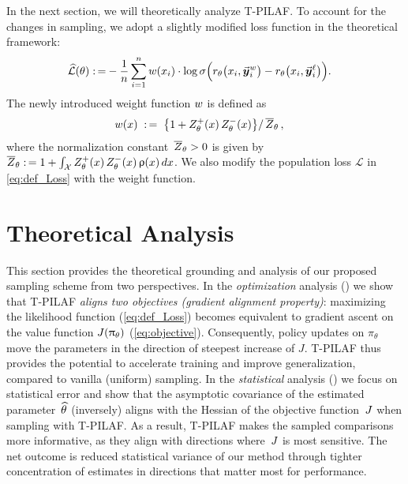 	In the next section, we will theoretically analyze T-PILAF. To account for the changes in sampling, we adopt a slightly modified loss function in the theoretical framework:
     \begin{align*}
		\widehat{\mathcal{L}}(\theta) :\,=
     	& - \frac{1}{n} \sum_{i=1}^{n} w(x_{i}) \cdot \log \sigma \Big( r_{\theta}\big(x_{i}, \vec{\boldsymbol{y}}\!\,^w_{i}\big) - r_{\theta}\big(x_{i}, \vec{\boldsymbol{y}}\!\,^{\ell}_{i}\big) \Big) .
     \end{align*}
	The newly introduced weight function $w$ is defined as
	\begin{align}
		w(x)
		& \label{eq:weight}
        \; :\,= \; \big\{ 1 + Z_{\theta}^+(x) \, Z_{\theta}^-(x) \big\} / \, \overline{Z}_{\theta} \, ,
	\end{align}
	where the normalization constant~$\overline{Z}_{\theta} > 0$ is given by \mbox{$\overline{Z}_{\theta} :\,= 1 + \int_{\mathcal{X}} Z_{\theta}^+(x) \, Z_{\theta}^-(x) \, \uprho(x) \, {d } x$}. We also modify the population loss $\mathcal{L}$ in \cref{eq:def_Loss} with the weight function.
	
	
	

\section{Theoretical Analysis}\label{sec:theory}
This section provides the theoretical grounding and analysis of our proposed sampling scheme from two perspectives. In the {\em optimization} analysis () we show that T-PILAF {\em aligns two objectives (gradient alignment property)}: maximizing the likelihood function (\cref{eq:def_Loss}) becomes equivalent to gradient ascent on the value function $J(\uppi_{\theta})$ (\cref{eq:objective}). Consequently, policy updates on $\pi_\theta$ move the parameters in the direction of steepest increase of $J$. T-PILAF thus provides the potential to accelerate training and improve generalization, compared to vanilla (uniform)  sampling. In the {\em statistical} analysis () we focus on statistical error and show that {the asymptotic covariance} of the estimated parameter~$\widehat{\theta}$ (inversely) aligns with the Hessian of the objective function~$J$ when sampling with T-PILAF. As a result, T-PILAF makes the sampled comparisons more informative, as they align with directions where~$J$ is most sensitive. The net outcome is reduced statistical variance of our method through tighter concentration of estimates in directions that matter most for performance.


